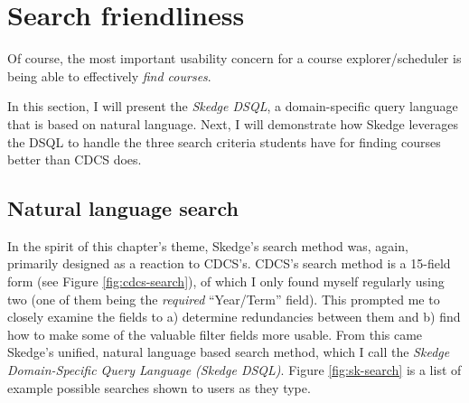
\section{Search friendliness}

Of course, the most important usability concern for a course explorer/scheduler is being able to effectively \emph{find courses}.

In this section, I will present the \emph{Skedge DSQL}, a domain-specific query language that is based on natural language. Next, I will demonstrate how Skedge leverages the DSQL to handle the three search criteria students have for finding courses better than CDCS does.

\subsection{Natural language search}

In the spirit of this chapter's theme, Skedge's search method was, again, primarily designed as a reaction to CDCS's. CDCS's search method is a 15-field form (see Figure \ref{fig:cdcs-search}), of which I only found myself regularly using two (one of them being the \emph{required} ``Year/Term'' field). This prompted me to closely examine the fields to a) determine redundancies between them and b) find how to make some of the valuable filter fields more usable. From this came Skedge's unified, natural language based search method, which I call the \emph{Skedge Domain-Specific Query Language (Skedge DSQL)}. Figure \ref{fig:sk-search} is a list of example possible searches shown to users as they type.

